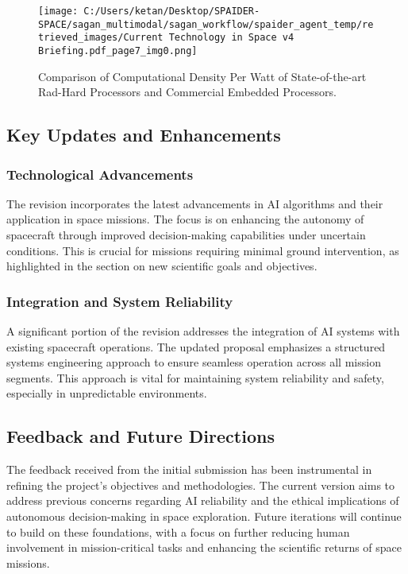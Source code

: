 \documentclass[a4paper,12pt]{article}
\begin{document}
\begin{figure}[htbp]
    \centering
    \texttt{[image: C:/Users/ketan/Desktop/SPAIDER-SPACE/sagan\_multimodal/sagan\_workflow/spaider\_agent\_temp/retrieved\_images/Current Technology in Space v4 Briefing.pdf\_page7\_img0.png]}
    \caption{Comparison of Computational Density Per Watt of State-of-the-art Rad-Hard Processors and Commercial Embedded Processors.}
    \label{fig:comp-density}
\end{figure}

\subsection{Key Updates and Enhancements}

\subsubsection{Technological Advancements}

The revision incorporates the latest advancements in AI algorithms and their application in space missions. The focus is on enhancing the autonomy of spacecraft through improved decision-making capabilities under uncertain conditions. This is crucial for missions requiring minimal ground intervention, as highlighted in the section on new scientific goals and objectives.

\subsubsection{Integration and System Reliability}

A significant portion of the revision addresses the integration of AI systems with existing spacecraft operations. The updated proposal emphasizes a structured systems engineering approach to ensure seamless operation across all mission segments. This approach is vital for maintaining system reliability and safety, especially in unpredictable environments.

\subsection{Feedback and Future Directions}

The feedback received from the initial submission has been instrumental in refining the project's objectives and methodologies. The current version aims to address previous concerns regarding AI reliability and the ethical implications of autonomous decision-making in space exploration. Future iterations will continue to build on these foundations, with a focus on further reducing human involvement in mission-critical tasks and enhancing the scientific returns of space missions.
\end{document}
